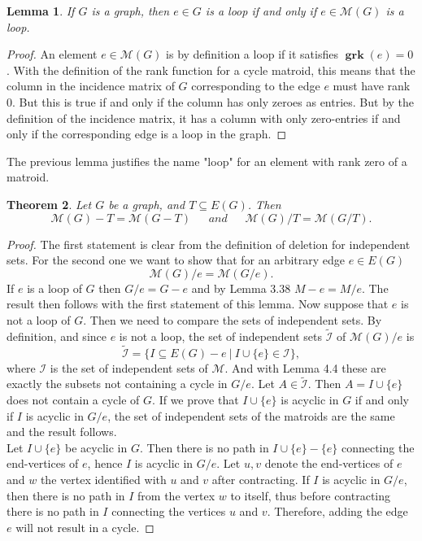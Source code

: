 \documentclass[12pt,a4paper, twoside, autooneside=false]{scrartcl}
\newtheorem{theorem}{Theorem}[section]
\newtheorem{lemma}[theorem]{Lemma}
\theoremstyle{definition}
\theoremstyle{remark}
\numberwithin{equation}{section}
\newcommand{\M}{\mathcal{M}} %
\DeclareMathOperator{\grk}{\mathbf{grk}} %
\begin{document}
\begin{lemma}
If $G$ is a graph, then $e \in G$ is a loop if and only if $e \in \M(G)$ is a loop.
\end{lemma}
\begin{proof}
An element $e \in \M(G)$ is by definition a loop if it satisfies $\grk(e) = 0$. With the definition of the rank function for a cycle matroid, this means that the column in the incidence matrix of $G$ corresponding to the edge $e$ must have rank $0$. But this is true if and only if the column has only zeroes as entries. But by the definition of the incidence matrix, it has a column with only zero-entries if and only if the corresponding edge is a loop in the graph.
\end{proof}
The previous lemma justifies the name "loop" for an element with rank zero of a matroid. 
\begin{theorem}
Let $G$ be a graph, and $T \subseteq E(G)$. Then 
\[
\M(G) - T = \M(G - T) \ \ \ \ \ \ \ and  \ \ \ \ \ \ \ \M(G) / T = \M(G / T).
\]
\end{theorem}
\begin{proof}
The first statement is clear from the definition of deletion for independent sets. 
For the second one we want to show that for an arbitrary edge $e \in E(G)$ 
\[
\M(G) / e = \M(G / e).
\] If $e$ is a loop of $G$ then $G / e = G - e$ and by Lemma 3.38 $M - e = M / e$. The result then follows with the first statement of this lemma. Now suppose that $e$ is not a loop of $G$. Then we need to compare the sets of independent sets. By definition, and since $e$ is not a loop, the set of independent sets $\tilde{\mathcal{I}}$ of $\M(G) / e$ is 
\[
\tilde{\mathcal{I}} = \{I \subseteq E(G) - e  \ | \  I \cup \{e\} \in \mathcal{I}\},
\]
where $\mathcal{I}$ is the set of independent sets of $\M$. And with Lemma 4.4 these are exactly the subsets not containing a cycle in $G/ e$. Let $A \in \tilde{\mathcal{I}}$. Then $A = I \cup \{e\}$ does not contain a cycle of $G$. If we prove that $I \cup \{e\}$ is acyclic in $G$ if and only if $I$ is acyclic in $G/e$, the set of independent sets of the matroids are the same and the result follows. \\
Let $I \cup \{e\}$ be acyclic in $G$. Then there is no path in $I \cup \{e\} - \{e\}$ connecting the end-vertices of $e$, hence $I$ is acyclic in $G / e$. Let $u,v$ denote the end-vertices of $e$ and $w$ the vertex identified with $u$ and $v$ after contracting. If $I$ is acyclic in $G / e$, then there is no path in $I$ from the vertex $w$ to itself, thus before contracting there is no path in $I$ connecting the vertices $u$ and $v$. Therefore, adding the edge $e$ will not result in a cycle. \qedhere
\end{proof}
\end{document}
